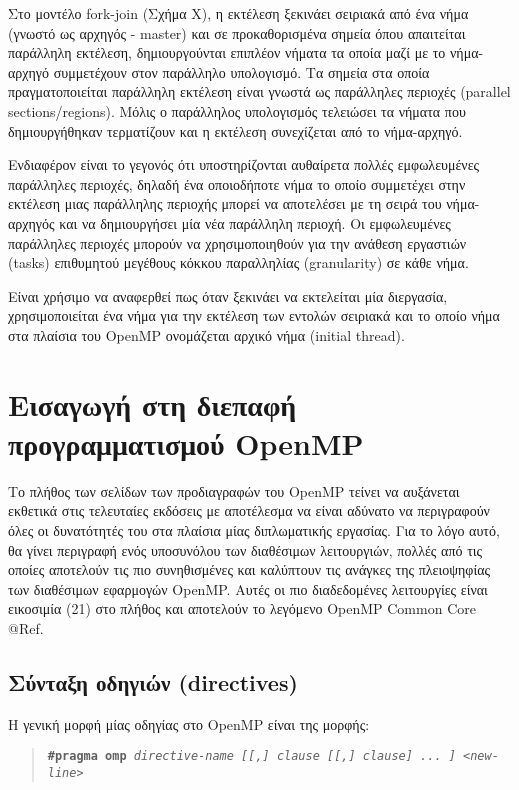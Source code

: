 Στο μοντέλο fork-join (Σχήμα Χ), η εκτέλεση ξεκινάει σειριακά από ένα νήμα (γνωστό ως αρχηγός - master) και σε προκαθορισμένα σημεία όπου απαιτείται παράλληλη εκτέλεση, δημιουργούνται επιπλέον νήματα τα οποία μαζί με το νήμα-αρχηγό συμμετέχουν στον παράλληλο υπολογισμό. Τα σημεία στα οποία πραγματοποιείται παράλληλη εκτέλεση είναι γνωστά ως παράλληλες περιοχές (parallel sections/regions). Μόλις ο παράλληλος υπολογισμός τελειώσει τα νήματα που δημιουργήθηκαν τερματίζουν και η εκτέλεση συνεχίζεται από το νήμα-αρχηγό.

Ενδιαφέρον είναι το γεγονός ότι υποστηρίζονται αυθαίρετα πολλές εμφωλευμένες παράλληλες περιοχές, δηλαδή ένα οποιοδήποτε νήμα το οποίο συμμετέχει στην εκτέλεση μιας παράλληλης περιοχής μπορεί να αποτελέσει με τη σειρά του νήμα-αρχηγός και να δημιουργήσει μία νέα παράλληλη περιοχή. Οι εμφωλευμένες παράλληλες περιοχές μπορούν να χρησιμοποιηθούν για την ανάθεση εργαστιών (tasks) επιθυμητού μεγέθους κόκκου παραλληλίας (granularity) σε κάθε νήμα.

Είναι χρήσιμο να αναφερθεί πως όταν ξεκινάει να εκτελείται μία διεργασία, χρησιμοποιείται ένα νήμα για την εκτέλεση των εντολών σειριακά και το οποίο νήμα στα πλαίσια του OpenMP ονομάζεται αρχικό νήμα (initial thread).

\section{Εισαγωγή στη διεπαφή προγραμματισμού OpenMP}

Το πλήθος των σελίδων των προδιαγραφών του OpenMP τείνει να αυξάνεται εκθετικά στις τελευταίες εκδόσεις με αποτέλεσμα να είναι αδύνατο να περιγραφούν όλες οι δυνατότητές του στα πλαίσια μίας διπλωματικής εργασίας. Για το λόγο αυτό, θα γίνει περιγραφή ενός υποσυνόλου των διαθέσιμων λειτουργιών, πολλές από τις οποίες αποτελούν τις πιο συνηθισμένες και καλύπτουν τις ανάγκες της πλειοψηφίας των διαθέσιμων εφαρμογών OpenMP. Αυτές οι πιο διαδεδομένες λειτουργίες είναι εικοσιμία (21) στο πλήθος και αποτελούν το λεγόμενο OpenMP Common Core @Ref.

\subsection{Σύνταξη οδηγιών (directives)}
Η γενική μορφή μίας οδηγίας στο OpenMP είναι της μορφής:

\begin{quote}
	\texttt{\textbf{\#pragma omp} \textit{directive-name [[,] clause [[,] clause] ... ] <new-line>}}
\end{quote}

